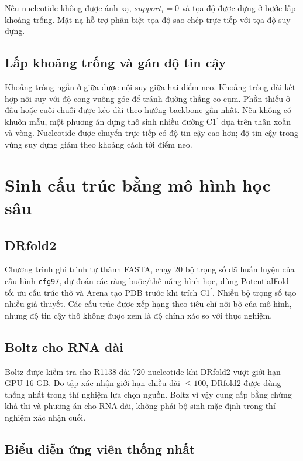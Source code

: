 \documentclass[12pt,a4paper,oneside]{report}
\newcommand{\cprime}{C1$^{\prime}$}
\begin{document}
Nếu nucleotide không được ánh xạ, $support_i=0$ và tọa độ được dựng ở bước lấp khoảng
trống. Mặt nạ hỗ trợ phân biệt tọa độ sao chép trực tiếp với tọa độ suy dựng.

\subsection{Lấp khoảng trống và gán độ tin cậy}

Khoảng trống ngắn ở giữa được nội suy giữa hai điểm neo. Khoảng trống dài kết hợp nội
suy với độ cong vuông góc để tránh đường thẳng co cụm. Phần thiếu ở đầu hoặc cuối chuỗi
được kéo dài theo hướng backbone gần nhất. Nếu không có khuôn mẫu, một phương án dựng
thô sinh nhiều đường \cprime{} dựa trên thân xoắn và vòng. Nucleotide được chuyển trực tiếp
có độ tin cậy cao hơn; độ tin cậy trong vùng suy dựng giảm theo khoảng cách tới điểm neo.

\section{Sinh cấu trúc bằng mô hình học sâu}

\subsection{DRfold2}

Chương trình ghi trình tự thành FASTA, chạy 20 bộ trọng số đã huấn luyện của cấu hình \texttt{cfg97},
dự đoán các ràng buộc/thế năng hình học, dùng PotentialFold tối ưu cấu trúc thô và Arena
tạo PDB trước khi trích \cprime{}. Nhiều bộ trọng số tạo nhiều giả thuyết. Các cấu trúc
được xếp hạng theo tiêu chí nội bộ của mô hình, nhưng độ tin cậy thô không được xem là
độ chính xác so với thực nghiệm.

\subsection{Boltz cho RNA dài}

Boltz được kiểm tra cho R1138 dài 720 nucleotide khi DRfold2 vượt giới hạn GPU 16 GB.
Do tập xác nhận giới hạn chiều dài $\le100$, DRfold2 được dùng thống nhất trong thí
nghiệm lựa chọn nguồn. Boltz vì vậy cung cấp bằng chứng khả thi và phương án cho RNA
dài, không phải bộ sinh mặc định trong thí nghiệm xác nhận cuối.

\subsection{Biểu diễn ứng viên thống nhất}
\end{document}
